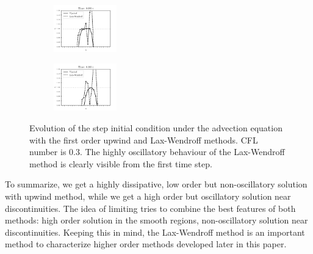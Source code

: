 \documentclass[journal,onecolumn]{IEEEtran}
\begin{document}
\begin{figure}
\begin{subfigure}{\textwidth}
    \end{subfigure}
    \begin{subfigure}{\textwidth}
    \centering
    \includegraphics[width=0.3\textwidth]{figures/lax0.080.pdf}
    \end{subfigure}
        \begin{subfigure}{\textwidth}
    \centering
    \includegraphics[width=0.3\textwidth]{figures/lax0.160.pdf}
    \end{subfigure}
    \caption{Evolution of the step initial condition under the advection equation with the first order upwind and Lax-Wendroff methods. CFL number is 0.3. The highly oscillatory behaviour of the Lax-Wendroff method is clearly visible from the first time step.}
    \label{fig:lax_wendroff}
\end{figure}

\newline
To summarize, we get a highly dissipative, low order but non-oscillatory solution with upwind method, while we get a high order but oscillatory solution near discontinuities. The idea of limiting tries to combine the best features of both methods: high order solution in the smooth regions, non-oscillatory solution near discontinuities. Keeping this in mind, the Lax-Wendroff method is an important method to characterize higher order methods developed later in this paper.
\end{document}
